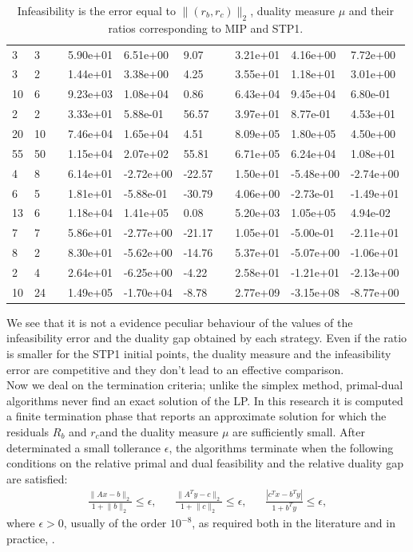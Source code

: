 \documentclass[a4paper,10 pt,titlepage,twoside]{book}
\theoremstyle{plain}
\theoremstyle{definition}
\theoremstyle{remark}
\begin{document}
\begin{table}[!h]
\begin{tabular}{llllllllll}
		3 & 3 &  & 5.90e+01 & 6.51e+00 & 9.07 &  & 3.21e+01 & 4.16e+00 & 7.72e+00 \\
		3 & 2 &  & 1.44e+01 & 3.38e+00 & 4.25 &  & 3.55e+01 & 1.18e+01 & 3.01e+00 \\
		10 & 6 &  & 9.23e+03 & 1.08e+04 & 0.86 &  & 6.43e+04 & 9.45e+04 & 6.80e-01 \\
		2 & 2 &  & 3.33e+01 & 5.88e-01 & 56.57 &  & 3.97e+01 & 8.77e-01 & 4.53e+01 \\
		20 & 10 &  & 7.46e+04 & 1.65e+04 & 4.51 &  & 8.09e+05 & 1.80e+05 & 4.50e+00 \\
		55 & 50 &  & 1.15e+04 & 2.07e+02 & 55.81 &  & 6.71e+05 & 6.24e+04 & 1.08e+01 \\
		4 & 8 &  & 6.14e+01 & -2.72e+00 & -22.57 &  & 1.50e+01 & -5.48e+00 & -2.74e+00 \\
		6 & 5 &  & 1.81e+01 & -5.88e-01 & -30.79 &  & 4.06e+00 & -2.73e-01 & -1.49e+01 \\
		13 & 6 &  & 1.18e+04 & 1.41e+05 & 0.08 &  & 5.20e+03 & 1.05e+05 & 4.94e-02 \\
		7 & 7 &  & 5.86e+01 & -2.77e+00 & -21.17 &  & 1.05e+01 & -5.00e-01 & -2.11e+01 \\
		8 & 2 &  & 8.30e+01 & -5.62e+00 & -14.76 &  & 5.37e+01 & -5.07e+00 & -1.06e+01 \\
		2 & 4 &  & 2.64e+01 & -6.25e+00 & -4.22 &  & 2.58e+01 & -1.21e+01 & -2.13e+00 \\
		10 & 24 &  & 1.49e+05 & -1.70e+04 & -8.78 &  & 2.77e+09 & -3.15e+08 & -8.77e+00 \\ \hline
	\end{tabular}\caption{Infeasibility is the error equal to $\lVert (r_{b}, r_{c})\rVert_{2}$, duality measure ${\mu}$ and their ratios corresponding to MIP and STP1.}
\end{table}
We see that it is not a evidence peculiar behaviour of the values of the infeasibility error and the duality gap obtained by each strategy. Even if the ratio is smaller for the STP1 initial points, the duality measure and the infeasibility error are competitive and they don't lead to an effective comparison.\\ 
\newpage
Now we deal on the termination criteria; unlike the simplex method, primal-dual algorithms never find an exact solution of the LP. In this research it is computed a finite termination phase that reports an approximate solution for which the residuals $R_{b}$ and $r_{c} $and the duality measure $\mu$ are sufficiently small. After determinated a small tollerance $\epsilon$, the algorithms terminate when the following conditions on the relative primal and dual feasibility and the relative duality gap are satisfied:
\begin{align*}
\frac{\lVert Ax -b\rVert_{2}}{1+ \lVert b \rVert_{2}}\leq \epsilon, && \frac{\lVert A^{T}y -c\rVert_{2}}{1 + \lVert c \rVert_{2}}\leq \epsilon, &&\frac{|c^{T}x - b^{T}y|}{1+b^{T}y}\leq \epsilon,
\end{align*}
where $\epsilon > 0$, usually of the order $10^{-8}$, as required both in the literature and in practice, \cite{Wright}.
\end{document}
